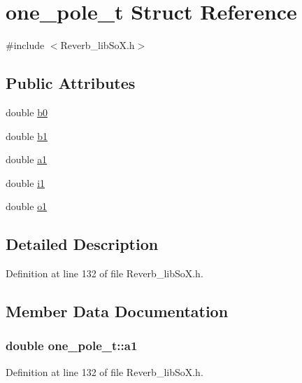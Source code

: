 \hypertarget{structone__pole__t}{}\section{one\+\_\+pole\+\_\+t Struct Reference}
\label{structone__pole__t}


{\ttfamily \#include $<$Reverb\+\_\+lib\+So\+X.\+h$>$}

\subsection*{Public Attributes}
\begin{DoxyCompactItemize}
\item 
double \hyperlink{structone__pole__t_af4501cb928a4f905c2876da8e7e9bcc2}{b0}
\item 
double \hyperlink{structone__pole__t_a5cc580efdd88263e7c4ea25d60e27ec3}{b1}
\item 
double \hyperlink{structone__pole__t_aaf4e6a097a8c182940ac72e65806c425}{a1}
\item 
double \hyperlink{structone__pole__t_aaeb3c0fd9f16b5a4f682cd4ef1623313}{i1}
\item 
double \hyperlink{structone__pole__t_a2497b72bb0c0600815e426b5ca2673e7}{o1}
\end{DoxyCompactItemize}


\subsection{Detailed Description}


Definition at line 132 of file Reverb\+\_\+lib\+So\+X.\+h.



\subsection{Member Data Documentation}
\subsubsection[{\texorpdfstring{a1}{a1}}]{\setlength{\rightskip}{0pt plus 5cm}double one\+\_\+pole\+\_\+t\+::a1}\hypertarget{structone__pole__t_aaf4e6a097a8c182940ac72e65806c425}{}\label{structone__pole__t_aaf4e6a097a8c182940ac72e65806c425}


Definition at line 132 of file Reverb\+\_\+lib\+So\+X.\+h.

